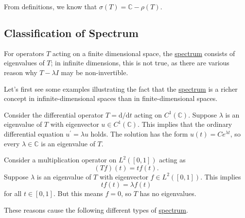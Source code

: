 From definitions, we know that \(\sigma (T) = \mathbb{C} - \rho (T)\).

\subsection{Classification of Spectrum}
For operators \(T\) acting on a finite dimensional space, the \hyperref[def:spectrum-point]{spectrum} consists of eigenvalues of \(T\); in infinite dimensions, this is not true, as there are various reason why \(T - \lambda I\) may be non-invertible.

Let's first see some examples illustrating the fact that the \hyperref[def:spectrum-point]{spectrum} is a richer concept in infinite-dimensional spaces than in finite-dimensional spaces.

\begin{eg}
	Consider the differential operator \(T = \mathrm{d} / \mathrm{d}t \) acting on \(C^1(\mathbb{C} )\). Suppose \(\lambda \) is an eigenvalue of \(T\) with eigenvector \(u\in C^1(\mathbb{C} )\). This implies that the ordinary differential equation \(u^\prime = \lambda u\) holds. The solution has the form \(u(t) = C e^{\lambda t}\), so every \(\lambda \in \mathbb{C} \) is an eigenvalue of \(T\).
\end{eg}

\begin{eg}[No eigenvalues]
	Consider a multiplication operator on \(L^2([0, 1])\) acting as
	\[
		(Tf)(t) = tf(t).
	\]
	Suppose \(\lambda \) is an eigenvalue of \(T\) with eigenvector \(f\in L^2([0, 1])\). This implies
	\[
		tf(t) = \lambda f(t)
	\]
	for all \(t\in [0, 1]\). But this means \(f=0\), so \(T\) has no eigenvalues.
\end{eg}

These reasons cause the following different types of \hyperref[def:spectrum-point]{spectrum}.


